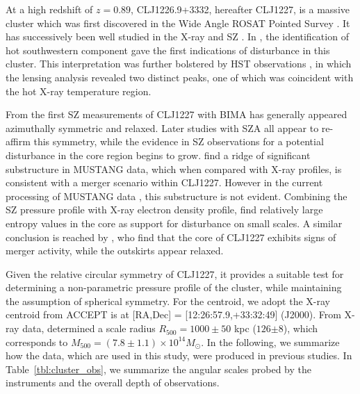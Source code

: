 \documentclass[onecolumn,traditabstract]{aa}
\begin{document}


At a high redshift of $z=0.89$, CLJ1226.9+3332, hereafter CLJ1227, is a massive cluster which was first discovered in the
Wide Angle ROSAT Pointed Survey \citep[WARPS][]{ebeling2001}. It has successively been well studied in the X-ray
\citep[\emph{XMM},\emph{Chandra}, and \emph{XMM/Chandra}][respectively]{maughan2004,bonamente2006,maughan2007}
and SZ \citep[][]{joy2001,muchovej2007,mroczkowski2009,mroczkowski2011,bulbul2010,korngut2011,adam2015}.
In \citet{maughan2007}, the identification of hot southwestern component gave the first indications of disturbance
in this cluster. This interpretation was further bolstered by HST observations \citep{jee2009a}, in which the lensing
analysis revealed two distinct peaks, one of which was coincident with the hot X-ray temperature region.

From the first SZ measurements of CLJ1227 with BIMA \citep[][]{joy2001} has generally appeared
azimuthally symmetric and relaxed. Later studies with SZA \citep{muchovej2007,mroczkowski2009,mroczkowski2011}
all appear to re-affirm this symmetry, while the evidence in SZ observations for a potential disturbance
in the core region begins to grow. \citet{korngut2011} find a ridge of significant substructure in
MUSTANG data, which when compared with X-ray profiles, is consistent with a merger scenario within
CLJ1227. However in the current processing of MUSTANG data \citep{romero2017},
this substructure is not evident. Combining the SZ pressure profile with X-ray electron density profile,
\citet{adam2015} find relatively large entropy values in the core as support for disturbance on small scales.
A similar conclusion is reached by \citet{rumsey2016}, who find that the core
of CLJ1227 exhibits signs of merger activity, while the outskirts appear relaxed.

Given the relative circular symmetry of CLJ1227, it provides a suitable test for determining a non-parametric pressure
profile of the cluster, while maintaining the assumption of spherical symmetry. For the centroid, we adopt the X-ray
centroid from ACCEPT \citep{cavagnolo2009} is at [RA,Dec] = [12:26:57.9,+33:32:49] (J2000).
From X-ray data, \citet{mantz2010b} determined a scale radius $R_{500} = 1000 \pm 50$ kpc ($126$\asecs$\pm8$\asec), which corresponds to
$M_{500} = (7.8 \pm 1.1) \times 10^{14} M_{\odot}$. In the following, we summarize how the data, which are used in this study,
were produced in previous studies. In Table~\ref{tbl:cluster_obs}, we summarize the angular scales probed by the instruments
and the overall depth of observations.
\end{document}

